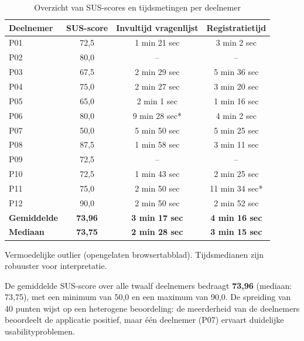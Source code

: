 \begin{table}[H]
    \centering
    \caption{Overzicht van SUS-scores en tijdsmetingen per deelnemer}
    \label{tab:sus-scores}
    \begin{tabular}{lccc}
        \toprule
        \textbf{Deelnemer} & \textbf{SUS-score} & \textbf{Invultijd vragenlijst} & \textbf{Registratietijd} \\
        \midrule
        P01 &  72,5 &  1 min 21 sec & 3 min 2 sec \\
        P02 &  80,0 &      -- &      -- \\
        P03 &  67,5 & 2 min 29 sec & 5 min 36 sec \\
        P04 &  75,0 & 2 min 27 sec & 3 min 20 sec \\
        P05 &  65,0 & 2 min 1 sec &  1 min 16 sec \\
        P06 &  80,0 & 9 min 28 sec* & 4 min 2 sec \\
        P07 &  50,0 & 5 min 50 sec & 5 min 25 sec \\
        P08 &  87,5 & 1 min 58 sec & 3 min 11 sec \\
        P09 &  72,5 &      -- &      -- \\
        P10 &  72,5 & 1 min 43 sec & 2 min 25 sec \\
        P11 &  75,0 & 2 min 50 sec & 11 min 34 sec* \\
        P12 &  90,0 & 2 min 50 sec & 2 min 52 sec \\
        \midrule
        \textbf{Gemiddelde} & \textbf{73,96} & \textbf{3 min 17 sec} & \textbf{4 min 16 sec} \\
        \textbf{Mediaan}    & \textbf{73,75} & \textbf{2 min 28 sec} & \textbf{3 min 15 sec} \\
        \bottomrule
    \end{tabular}
    \begin{tablenotes}
        \small
        \item *Vermoedelijke outlier (opengelaten browsertabblad). Tijdsmedianen zijn robuuster voor interpretatie.
    \end{tablenotes}
\end{table}

De gemiddelde SUS-score over alle twaalf deelnemers bedraagt \textbf{73,96} (mediaan: 73,75), met een minimum van 50,0 en een maximum van 90,0.
De spreiding van 40 punten wijst op een heterogene beoordeling: de meerderheid van de deelnemers beoordeelt de applicatie positief, maar één deelnemer (P07) ervaart duidelijke usabilityproblemen.
\medskip

